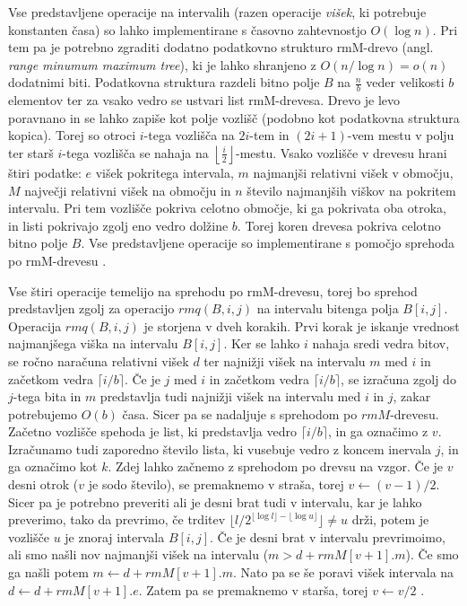 Vse predstavljene operacije na intervalih (razen operacije \textit{višek}, ki potrebuje konstanten časa) so lahko implementirane s časovno zahtevnostjo $O(\log{n})$. Pri tem pa je potrebno zgraditi dodatno podatkovno strukturo rmM-drevo (angl. \textit{range minumum maximum tree}), ki je lahko shranjeno z $O(n/\log{n})=o(n)$ dodatnimi biti. Podatkovna struktura razdeli bitno polje $B$ na $\frac{n}{b}$ veder velikosti $b$ elementov ter za vsako vedro se ustvari list rmM-drevesa. Drevo je levo poravnano in se lahko zapiše kot polje vozlišč (podobno kot podatkovna struktura kopica). Torej so otroci $i$-tega vozlišča na $2i$-tem in $(2i+1)$-vem mestu v polju ter starš $i$-tega vozlišča se nahaja na $\left\lfloor\frac{i}{2}\right\rfloor$-mestu. Vsako vozlišče v drevesu hrani štiri podatke: $e$ višek pokritega intervala, $m$ najmanjši relativni višek v območju, $M$ največji relativni višek na območju in $n$ število najmanjših viškov na pokritem intervalu. Pri tem vozlišče pokriva celotno območje, ki ga pokrivata oba otroka, in listi pokrivajo zgolj eno vedro dolžine $b$. Torej koren drevesa pokriva celotno bitno polje $B$. Vse predstavljene operacije so implementirane s pomočjo sprehoda po rmM-drevesu \cite{Navarro2016}.

Vse štiri operacije temelijo na sprehodu po rmM-drevesu, torej bo sprehod predstavljen zgolj za operacijo $rmq(B,i,j)$ na intervalu bitenga polja $B[i,j]$. Operacija $rmq(B,i,j)$ je storjena v dveh korakih. Prvi korak je iskanje vrednost najmanjšega viška na intervalu $B[i,j]$. Ker se lahko $i$ nahaja sredi vedra bitov, se ročno naračuna relativni višek $d$ ter najnižji višek na intervalu $m$ med $i$ in začetkom vedra $\lceil i/b\rceil$. Če je $j$ med $i$ in začetkom vedra  $\lceil i/b\rceil$, se izračuna zgolj do $j$-tega bita in $m$ predstavlja tudi najnižji višek na intervalu med $i$ in $j$, zakar potrebujemo $O(b)$ časa. Sicer pa se nadaljuje s sprehodom po $rmM$-drevesu. Začetno vozlišče spehoda je list, ki predstavlja vedro  $\lceil i/b\rceil$, in ga označimo z $v$. Izračunamo tudi zaporedno število lista, ki vusebuje vedro z koncem inervala $j$, in ga označimo kot $k$. Zdej lahko začnemo z sprehodom po drevsu na vzgor. Če je $v$ desni otrok ($v$ je sodo število), se premaknemo v straša, torej $v\leftarrow (v-1)/2$. Sicer pa je potrebno preveriti ali je desni brat tudi v intervalu, kar je lahko preverimo, tako da prevrimo, če trditev $\lfloor l/2^{\lfloor \log l\rfloor- \lfloor \log u \rfloor}\rfloor\ne u$ drži, potem je vozlišče $u$ je znoraj intervala $B[i,j]$. Če je desni brat v intervalu prevrimoimo, ali smo našli nov najmanjši višek na intervalu ($m>d+rmM[v+1].m$). Če smo ga našli potem $m\leftarrow d+rmM[v+1].m$. Nato pa se še poravi višek intervala na $d\leftarrow d+rmM[v+1].e$. Zatem pa se premaknemo v starša, torej $v\leftarrow v/2$ \cite{Navarro2016}.

